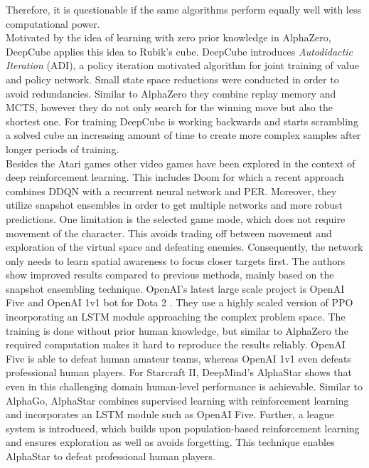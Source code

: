    Therefore, it is questionable if the same algorithms perform equally well with less computational power.\\
    Motivated by the idea of learning with zero prior knowledge in AlphaZero, DeepCube \cite{McAleer2018} applies this idea to Rubik's cube. 
    DeepCube introduces \textit{Autodidactic Iteration} (ADI), a policy iteration motivated algorithm for joint training of value and policy network.
    Small state space reductions were conducted in order to avoid redundancies.
    Similar to AlphaZero they combine replay memory and MCTS, however they do not only search for the winning move but also the shortest one.
    For training DeepCube is working backwards and starts scrambling a solved cube an increasing amount of time to create more complex samples after longer periods of training.\\
    Besides the Atari games other video games have been explored in the context of deep reinforcement learning. 
    This includes Doom for which a recent approach \cite{Schulze2018} combines DDQN with a recurrent neural network and PER.
    Moreover, they utilize snapshot ensembles in order to get multiple networks and more robust predictions.
    One limitation is the selected game mode, which does not require movement of the character.
    This avoids trading off between movement and exploration of the virtual space and defeating enemies. 
    Consequently, the network only needs to learn spatial awareness to focus closer targets first. 
    The authors show improved results compared to previous methods, mainly based on the snapshot ensembling technique.
    OpenAI's latest large scale project is OpenAI Five and OpenAI 1v1 bot for Dota 2 \cite{OpenAI2018}.
    They use a highly scaled version of PPO incorporating an LSTM module approaching the complex problem space. 
    The training is done without prior human knowledge, but similar to AlphaZero the required computation makes it hard to reproduce the results reliably.
    OpenAI Five is able to defeat human amateur teams, whereas OpenAI 1v1 even defeats professional human players.  
    For Starcraft II, DeepMind's AlphaStar \cite{Vinyals2019} shows that even in this challenging domain human-level performance is achievable.
    Similar to AlphaGo, AlphaStar combines supervised learning with reinforcement learning and incorporates an LSTM module such as OpenAI Five.
    Further, a league system is introduced, which builds upon population-based reinforcement learning and ensures exploration as well as avoids forgetting. 
    This technique enables AlphaStar to defeat professional human players.
    
